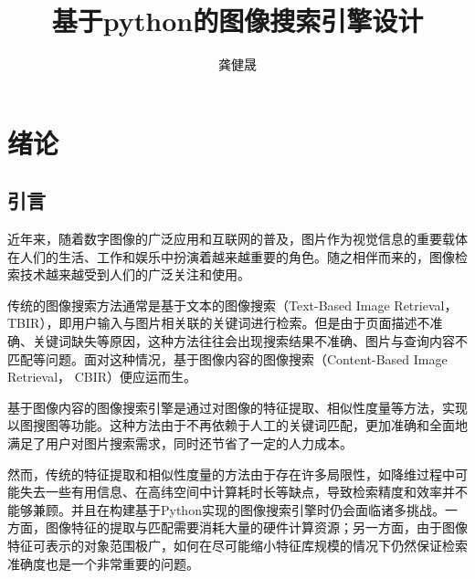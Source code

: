 \documentclass[bachelor_p]{hdu-thesis}
\title{基于python的图像搜索引擎设计}{Image search engine based on Python}
\author{龚健晟}{Gong Jiansheng}%
\begin{document}
\makecover
\makedeclaration

 
 






\tableofcontents





\chapter{绪论}
\section{引言}
近年来，随着数字图像的广泛应用和互联网的普及，图片作为视觉信息的重要载体在人们的生活、工作和娱乐中扮演着越来越重要的角色。随之相伴而来的，图像检索技术越来越受到人们的广泛关注和使用。

传统的图像搜索方法通常是基于文本的图像搜索（Text-Based Image Retrieval， TBIR），即用户输入与图片相关联的关键词进行检索。但是由于页面描述不准确、关键词缺失等原因，这种方法往往会出现搜索结果不准确、图片与查询内容不匹配等问题。面对这种情况，基于图像内容的图像搜索（Content-Based Image Retrieval， CBIR）便应运而生。

基于图像内容的图像搜索引擎是通过对图像的特征提取、相似性度量等方法，实现以图搜图等功能。这种方法由于不再依赖于人工的关键词匹配，更加准确和全面地满足了用户对图片搜索需求，同时还节省了一定的人力成本。

然而，传统的特征提取和相似性度量的方法由于存在许多局限性，如降维过程中可能失去一些有用信息、在高纬空间中计算耗时长等缺点，导致检索精度和效率并不能够兼顾。并且在构建基于Python实现的图像搜索引擎时仍会面临诸多挑战。一方面，图像特征的提取与匹配需要消耗大量的硬件计算资源；另一方面，由于图像特征可表示的对象范围极广，如何在尽可能缩小特征库规模的情况下仍然保证检索准确度也是一个非常重要的问题。
\end{document}
